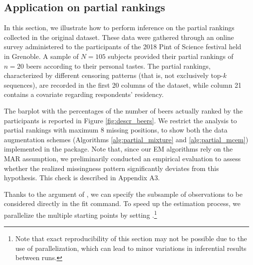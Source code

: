 \subsection{Application on partial rankings}
\label{subsec:est_partial}

In this section, we illustrate how to perform inference on the partial rankings collected in the original  dataset.
These data were gathered through an online survey administered to the participants of the 2018 Pint of Science festival held in Grenoble. A sample of $N = 105$ subjects provided their partial rankings of $n=20$ beers according to their personal tastes. The partial rankings, characterized by different censoring patterns (that is, not exclusively top-$k$ sequences), are recorded in the first 20 columns of the dataset, while column 21 contains a covariate regarding respondents' residency.

The barplot with the percentages of the number of beers actually ranked by the participants is reported in Figure \ref{fig:descr_beers}. We restrict the analysis to partial rankings with maximum 8 missing positions, to show both the data augmentation schemes (Algorithms \ref{alg:partial_mixture} and \ref{alg:partial_mcem}) implemented in the package. {Note that, since our EM algorithms rely on the MAR assumption, we preliminarily conducted an empirical evaluation to assess whether the realized missingness pattern significantly deviates from this hypothesis. This check is described in Appendix A3.}

Thanks to the  argument of , we can specify the subsample of observations to be considered directly in the fit command.
To speed up the estimation process, we parallelize the multiple starting points by setting  .\footnote{Note that exact reproducibility of this section may not be possible due to the use of parallelization, which can lead to minor variations in inferential results between runs.}

